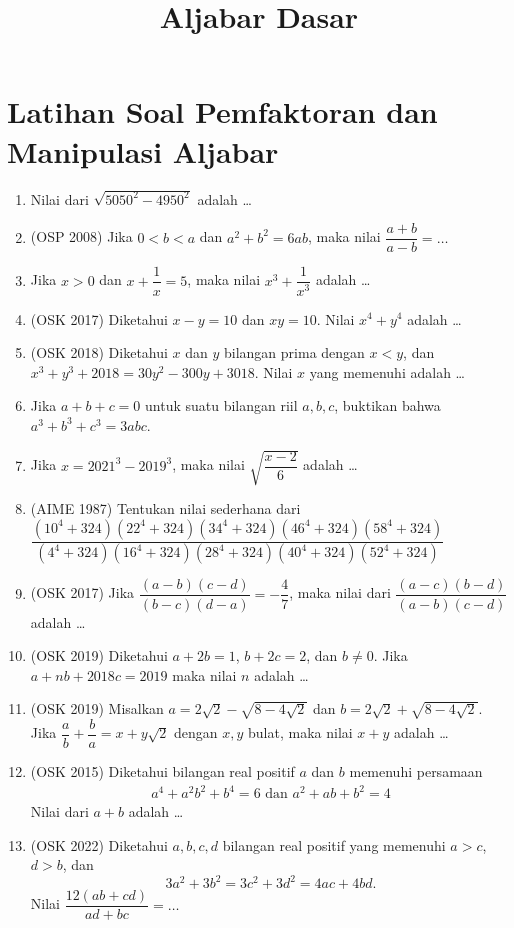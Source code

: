 \documentclass[a4paper]{article}
\begin{document}
\title{Aljabar Dasar}
\maketitle
\section{Latihan Soal Pemfaktoran dan Manipulasi Aljabar}
\begin{enumerate}
    \item  Nilai dari $\sqrt{5050^2-4950^2}$ adalah \dots

    \item (OSP 2008) Jika $0 < b < a$ dan $a^2+b^2=6ab$, maka nilai $\dfrac{a+b}{a-b}=\dots$
    
    \item Jika $x > 0$ dan $x + \dfrac{1}{x} =  5$, maka nilai $x^3+\dfrac{1}{x^3}$ adalah \dots
    
    \item (OSK 2017) Diketahui $x-y=10$ dan $xy=10$. Nilai $x^4+y^4$ adalah \dots
    
    \item (OSK 2018) Diketahui $x$ dan $y$ bilangan prima dengan $x < y$, dan $x^3+y^3+2018=30y^2-300y+3018$. Nilai $x$ yang memenuhi adalah \dots
    
    \item Jika $a+b+c=0$ untuk suatu bilangan riil $a,b,c$, buktikan bahwa $a^3+b^3+c^3=3abc$.
    
    \item Jika $x=2021^3-2019^3$, maka nilai $\sqrt{\dfrac{x-2}{6}}$ adalah \dots

    \item (AIME 1987)
    Tentukan nilai sederhana dari $\dfrac{(10^4+324)(22^4+324)(34^4+324)(46^4+324)(58^4+324)}{(4^4+324)(16^4+324)(28^4+324)(40^4+324)(52^4+324)}$

    \item (OSK 2017) Jika $\dfrac{(a-b)(c-d)}{(b-c)(d-a)}=-\dfrac{4}{7}$, maka nilai dari $\dfrac{(a-c)(b-d)}{(a-b)(c-d)}$ adalah \dots

    \item (OSK 2019) Diketahui $a+2b=1$, $b+2c=2$, dan $b \neq 0$. Jika $a+nb+2018c = 2019$ maka nilai $n$ adalah \dots

    \item (OSK 2019) Misalkan $a = 2\sqrt{2} - \sqrt{8-4\sqrt{2}}$ dan $b = 2\sqrt{2} + \sqrt{8-4\sqrt{2}}$. Jika $\dfrac{a}{b}+\dfrac{b}{a}=x+y\sqrt{2}$ dengan $x,y$ bulat, maka nilai $x+y$ adalah \dots

    \item (OSK 2015) Diketahui bilangan real positif $a$ dan $b$ memenuhi persamaan
    \begin{align*}
        a^4+a^2b^2+b^4=6 \text{ dan } a^2+ab+b^2=4
    \end{align*}
    Nilai dari $a + b$ adalah \ldots

    \item (OSK 2022) Diketahui $a,b,c,d$ bilangan real positif yang memenuhi $a>c$, $d>b$, dan 
    $$3a^2+3b^2=3c^2+3d^2=4ac+4bd.$$
    Nilai $\dfrac{12(ab+cd)}{ad+bc}=\dots$ 
\end{enumerate}
\end{document}
